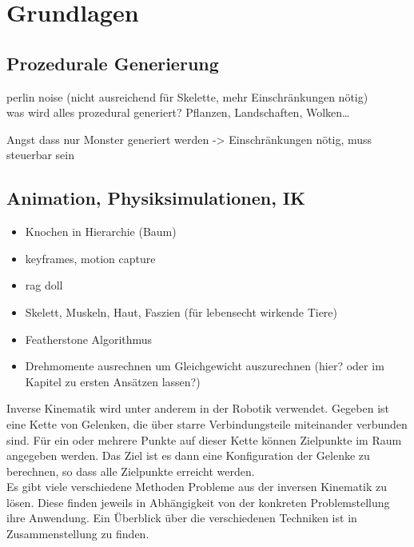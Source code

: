 \chapter{Grundlagen}

\section{Prozedurale Generierung}

perlin noise (nicht ausreichend für Skelette, mehr Einschränkungen nötig)\\
was wird alles prozedural generiert? Pflanzen, Landschaften, Wolken\dots

Angst dass nur Monster generiert werden -> Einschränkungen nötig, muss steuerbar sein


\section{Animation, Physiksimulationen, IK}

\begin{itemize}
 \item Knochen in Hierarchie (Baum)
 \item keyframes, motion capture
 \item rag doll
 \item Skelett, Muskeln, Haut, Faszien (für lebensecht wirkende Tiere)
 \item Featherstone Algorithmus
 \item Drehmomente ausrechnen um Gleichgewicht auszurechnen (hier? oder im Kapitel zu ersten Ansätzen lassen?)
\end{itemize}

Inverse Kinematik wird unter anderem in der Robotik verwendet. Gegeben ist eine Kette von Gelenken, die über starre Verbindungsteile miteinander verbunden sind. Für ein oder mehrere Punkte auf dieser Kette können Zielpunkte im Raum angegeben werden. Das Ziel ist es dann eine Konfiguration der Gelenke zu berechnen, so dass alle Zielpunkte erreicht werden.\\
Es gibt viele verschiedene Methoden Probleme aus der inversen Kinematik zu lösen. Diese finden jeweils in Abhängigkeit von der konkreten Problemstellung ihre Anwendung. Ein Überblick über die verschiedenen Techniken ist in Zusammenstellung \cite{IKSurvey} zu finden.



